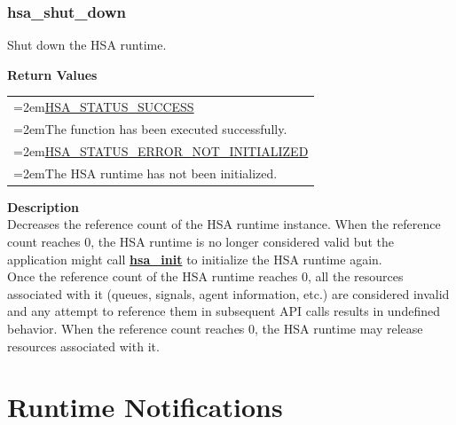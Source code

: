 \documentclass[final,oneside]{book}
\newcommand{\reffun}[1]{\textbf{#1}}
\newenvironment{mylongtable}{\rowcolors{0}{lightgray}{lightgray}\longtable} {
\endlongtable}
\begin{document}
\subsubsection{hsa_\-shut_\-down}
\vspace{-2.5mm}Shut down the HSA runtime.\begin{mylongtable}{@{}p{\textwidth}}

\end{mylongtable}
\vspace{-3.5mm}\textbf{Return Values}\\[-7mm]
\noindent\begin{longtable}{@{}>{\hangindent=2em}p{\linewidth}}
\hyperlink{group__status_1ggad755322e7ff95456520e8abdbe90d225ae382ea0c9c05cce5a60d0317375159cc}{HSA_\-STATUS_\-SUCCESS}\\\hspace{2em}The function has been executed successfully.\\[2mm]
\hyperlink{group__status_1ggad755322e7ff95456520e8abdbe90d225a34ea59ade5bfce95eee935238a99f5b5}{HSA_\-STATUS_\-ERROR_\-NOT_\-INITIALIZED}\\\hspace{2em}The HSA runtime has not been initialized.
\end{longtable}
\vspace{-2mm}\noindent\textbf{Description}\\
Decreases the reference count of the HSA runtime instance. When the reference count reaches 0, the HSA runtime is no longer considered valid but the application might call \hyperlink{group__initshutdown_1ga5b8574433e7dbcbd31ea397a02e3c32b}{\reffun{hsa_\-init}} to initialize the HSA runtime again.\\[2mm]
Once the reference count of the HSA runtime reaches 0, all the resources associated with it (queues, signals, agent information, etc.) are considered invalid and any attempt to reference them in subsequent API calls results in undefined behavior. When the reference count reaches 0, the HSA runtime may release resources associated with it. 
 

\section{Runtime Notifications}
\label{sec:error}
\end{document}

